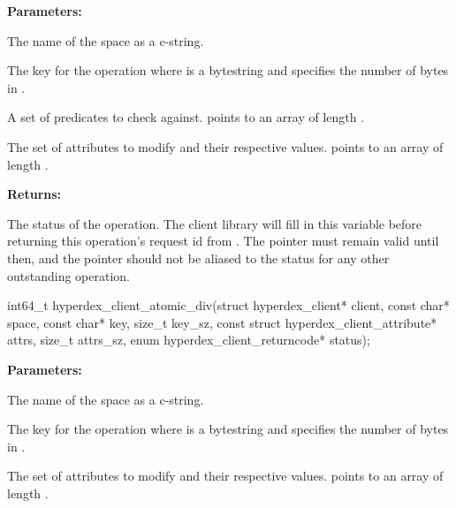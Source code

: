 \noindent\textbf{Parameters:}
\begin{description}[labelindent=\widthof{{\code{checks}, \code{checks\_sz}}},leftmargin=*,noitemsep,nolistsep,align=right]
\item[\code{space}] The name of the space as a c-string.
\item[\code{key}, \code{key\_sz}] The key for the operation where  is a bytestring and  specifies the number of bytes in .
\item[\code{checks}, \code{checks\_sz}] A set of predicates to check against.   points to an array of length .
\item[\code{attrs}, \code{attrs\_sz}] The set of attributes to modify and their respective values.   points to an array of length .
\end{description}

\noindent\textbf{Returns:}
\begin{description}[labelindent=\widthof{{\code{status}}},leftmargin=*,noitemsep,nolistsep,align=right]
\item[\code{status}] The status of the operation.  The client library will fill in this variable before returning this operation's request id from .  The pointer must remain valid until then, and the pointer should not be aliased to the status for any other outstanding operation.
\end{description}

\funcsep
{}
\begin{ccode}
int64_t hyperdex_client_atomic_div(struct hyperdex_client* client,
                const char* space,
                const char* key, size_t key_sz,
                const struct hyperdex_client_attribute* attrs, size_t attrs_sz,
                enum hyperdex_client_returncode* status);
\end{ccode}
\funcdesc 

\noindent\textbf{Parameters:}
\begin{description}[labelindent=\widthof{{\code{attrs}, \code{attrs\_sz}}},leftmargin=*,noitemsep,nolistsep,align=right]
\item[\code{space}] The name of the space as a c-string.
\item[\code{key}, \code{key\_sz}] The key for the operation where  is a bytestring and  specifies the number of bytes in .
\item[\code{attrs}, \code{attrs\_sz}] The set of attributes to modify and their respective values.   points to an array of length .
\end{description}

